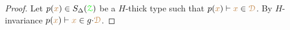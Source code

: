 \begin{proof}
  Let $p({\mr x})\in S_\Delta(\grZ)$ be a $H$-thick type such that $p({\mr x})\proves{\mr x}\in\mrD$.
  By $H$-invariance $p({\mr x})\proves{\mr x}\in g{\cdot}\mrD$.
\end{proof}







